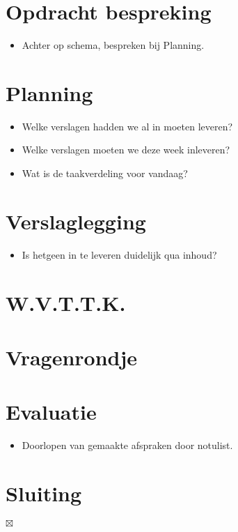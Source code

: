 \documentclass[]{article}
\begin{document}
    \section{Opdracht bespreking}
    \begin{itemize}
        \item Achter op schema, bespreken bij Planning.
    \end{itemize}

    \section{Planning}
    \begin{itemize}
        \item Welke verslagen hadden we al in moeten leveren?
        \item Welke verslagen moeten we deze week inleveren?
        \item Wat is de taakverdeling voor vandaag?
    \end{itemize}

    \section{Verslaglegging}
    \begin{itemize}
        \item Is hetgeen in te leveren duidelijk qua inhoud?
    \end{itemize}

    \section{W.V.T.T.K.}

    \section{Vragenrondje}

    \section{Evaluatie}
    \begin{itemize}
        \item Doorlopen van gemaakte afspraken door notulist.
    \end{itemize}

    \section{Sluiting}

    $\boxtimes$
\end{document}
